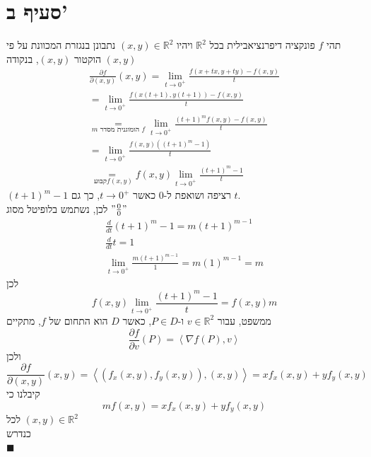 \documentclass[12pt, titlepage]{article}
\newcommand{\pard}[2][f]{\frac{\partial #1}{\partial #2}}
\begin{document}
\section*{סעיף ב'}
תהי $f$ פונקציה דיפרנציאבילית בכל $\mathbb{R}^2$ ויהיו $\left(x,y\right) \in \mathbb{R}^2$
נתבונן בנגזרת המכוונת על פי הוקטור $\left(x,y\right)$, בנקודה $\left(x,y\right)$
\begin{gather*}
    \pard{\left(x,y\right)} \left(x,y\right) = \lim_{t\to0^+} \frac{f\left(x+t x, y+ty\right)-f\left(x,y\right)}{t}  \\
    = \lim_{t\to0^+} \frac{f\left(x\left(t+1\right), y\left(t+1\right)\right)-f\left(x,y\right)}{t} \\
    \underset{m\text{ הומוגנית מסדר }f}{=} \lim_{t\to0^+} \frac{\left(t+1\right)^m f\left(x,y\right) - f\left(x,y\right)}{t} \\
    = \lim_{t\to0^+} \frac{f\left(x,y\right) \left(\left(t+1\right)^m - 1\right)}{t}\\
    \underset{\text{ קבוע} f\left(x,y\right)}{=} f\left(x,y\right) \lim_{t\to0^+} \frac{\left(t+1\right)^m-1}{t}
\end{gather*}
$\left(t+1\right)^m-1$ רציפה ושואפת ל-$0$ כאשר $t\to0^+$, כך גם $t$.\\
לכן, נשתמש בלופיטל מסוג $"\frac{0}{0}"$
\begin{gather*}
    \frac{d}{dt} \left(t+1\right)^m-1 =  m\left(t+1\right)^{m-1}\\
    \frac{d}{dt} t = 1\\
    \lim_{t\to0^+} \frac{m\left(t+1\right)^{m-1}}{1} = m\left(1\right)^{m-1} = m
\end{gather*}
לכן
\[
    f\left(x,y\right) \lim_{t\to0^+} \frac{\left(t+1\right)^m-1}{t} = f\left(x,y\right) m
\]
ממשפט, עבור $v \in \mathbb{R}^2$ ו-$P\in D$, כאשר $D$ הוא התחום של $f$, מתקיים 
\[
    \pard{v}\left(P\right) = \left<\nabla f\left(P\right),v\right>
\]
ולכן
\[
    \pard{\left(x,y\right)}\left(x,y\right) = \left< \left(f_x\left(x,y\right),f_y\left(x,y\right)\right),\left(x,y\right)\right> = xf_x\left(x,y\right) + yf_y\left(x,y\right)
\]
קיבלנו כי
\[
    m f\left(x,y\right) = xf_x\left(x,y\right) + yf_y\left(x,y\right) 
\]
לכל $\left(x,y\right) \in \mathbb{R}^2$\\
כנדרש\\
$\blacksquare$
\end{document}
